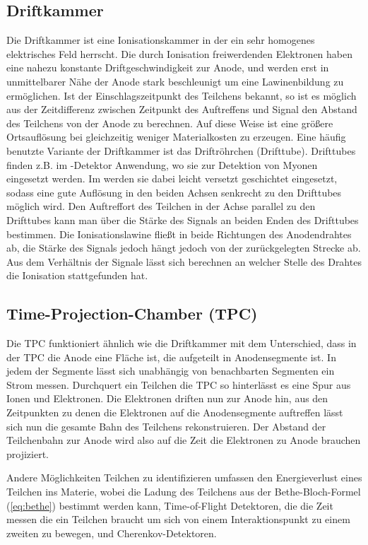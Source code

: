 \subsection{Driftkammer}\label{sec:drift}
Die Driftkammer ist eine Ionisationskammer in der ein sehr homogenes elektrisches Feld herrscht. Die durch Ionisation freiwerdenden Elektronen haben eine nahezu konstante Driftgeschwindigkeit zur Anode, und werden erst in unmittelbarer Nähe der Anode stark beschleunigt um eine Lawinenbildung zu ermöglichen. Ist der Einschlagszeitpunkt des Teilchens bekannt, so ist es möglich aus der Zeitdifferenz zwischen Zeitpunkt des Auftreffens und Signal den Abstand des Teilchens von der Anode zu berechnen. Auf diese Weise ist eine größere Ortsauflösung bei gleichzeitig weniger Materialkosten zu erzeugen.
Eine häufig benutzte Variante der Driftkammer ist das Driftröhrchen (Drifttube). Drifttubes finden z.B. im \atlas-Detektor Anwendung, wo sie zur Detektion von Myonen eingesetzt werden. Im \atlas werden sie dabei leicht versetzt geschichtet eingesetzt, sodass eine gute Auflösung in den beiden Achsen senkrecht zu den Drifttubes möglich wird. Den Auftreffort des Teilchen in der Achse parallel zu den Drifttubes kann man über die Stärke des Signals an beiden Enden des Drifttubes bestimmen. Die Ionisationslawine fließt in beide Richtungen des Anodendrahtes ab, die Stärke des Signals jedoch hängt jedoch von der zurückgelegten Strecke ab. Aus dem Verhältnis der Signale lässt sich berechnen an welcher Stelle des Drahtes die Ionisation stattgefunden hat.
\subsection{Time-Projection-Chamber (TPC)}
Die TPC funktioniert ähnlich wie die Driftkammer mit dem Unterschied, dass in der TPC die Anode eine Fläche ist, die aufgeteilt in Anodensegmente ist. In jedem der Segmente lässt sich unabhängig von benachbarten Segmenten ein Strom messen. Durchquert ein Teilchen die TPC so hinterlässt es eine Spur aus Ionen und Elektronen. Die Elektronen driften nun zur Anode hin, aus den Zeitpunkten zu denen die Elektronen auf die Anodensegmente auftreffen lässt sich nun die gesamte Bahn des Teilchens rekonstruieren. Der Abstand der Teilchenbahn zur Anode wird also auf die Zeit die Elektronen zu Anode brauchen projiziert.

Andere Möglichkeiten Teilchen zu identifizieren umfassen den Energieverlust eines Teilchen ins Materie, wobei die Ladung des Teilchens aus der Bethe-Bloch-Formel (\ref{eq:bethe}) bestimmt werden kann, Time-of-Flight Detektoren, die die Zeit messen die ein Teilchen braucht um sich von einem Interaktionspunkt zu einem zweiten zu bewegen, und Cherenkov-Detektoren. 
